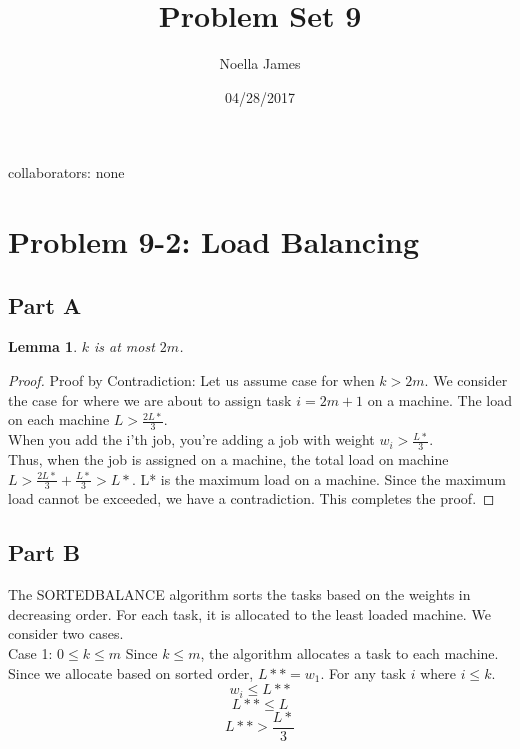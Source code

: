 \documentclass{article}
\theoremstyle{definition}
\theoremstyle{remark}
\theoremstyle{plain}
\newtheorem{lem}[thm]{Lemma}
\begin{document}
\title{Problem Set 9}
\date{04/28/2017}
\author{Noella James}
\maketitle
collaborators: none\\

\section*{Problem 9-2: Load Balancing}

\subsection*{Part A}

\begin{lem}
$k$ is at most $2m$.
\end{lem}
\begin{proof}
Proof by Contradiction: Let us assume case for when $k > 2m$. We consider the case for where we are about to assign task $i = 2m + 1$ on a machine. The load on each machine $L > \frac{2L*}{3}$. \\
When you add the i'th job, you're adding a job with weight $w_i > \frac{L*}{3}$.\\
Thus, when the job is assigned on a machine, the total load on machine $L > \frac{2L*}{3} +  \frac{L*}{3} > L*$. L* is the maximum load on a machine. Since the maximum load cannot be exceeded, we have a contradiction. This completes the proof. 

\end{proof}

\subsection*{Part B}

The SORTEDBALANCE algorithm sorts the tasks based on the weights in decreasing order. For each task, it is allocated to the least loaded machine. We consider two cases.\\
Case 1:  $0 \leq k \leq m$
Since $k \leq m$, the algorithm allocates a task to each machine. Since we allocate based on sorted order, $L** = w_1$. For any task $i$ where $i\leq k$.
\begin{equation}
w_i \leq L**
\end{equation}
\begin{equation}
L** \leq L
\end{equation}
\begin{equation}
L** > \frac{L*}{3}
\end{equation}
\end{document}
